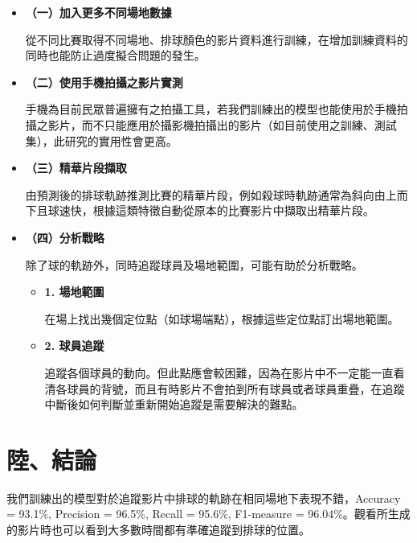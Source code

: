\begin{itemize}
    \setlength\parindent{2em}
    \item []
    \textbf{（一）加入更多不同場地數據}

    從不同比賽取得不同場地、排球顏色的影片資料進行訓練，在增加訓練資料的同時也能防止過度擬合問題的發生。

    \item []
    \textbf{（二）使用手機拍攝之影片實測}

    手機為目前民眾普遍擁有之拍攝工具，若我們訓練出的模型也能使用於手機拍攝之影片，而不只能應用於攝影機拍攝出的影片（如目前使用之訓練、測試集），此研究的實用性會更高。

    \item []
    \textbf{（三）精華片段擷取}

    由預測後的排球軌跡推測比賽的精華片段，例如殺球時軌跡通常為斜向由上而下且球速快，根據這類特徵自動從原本的比賽影片中擷取出精華片段。

    \item []
    \textbf{（四）分析戰略}
    
    除了球的軌跡外，同時追蹤球員及場地範圍，可能有助於分析戰略。

    \begin{itemize}
        \setlength\parindent{2em}
        \item []
        \textbf{1. 場地範圍}

        在場上找出幾個定位點（如球場端點），根據這些定位點訂出場地範圍。

        \item []
        \textbf{2. 球員追蹤}

        追蹤各個球員的動向。但此點應會較困難，因為在影片中不一定能一直看清各球員的背號，而且有時影片不會拍到所有球員或者球員重疊，在追蹤中斷後如何判斷並重新開始追蹤是需要解決的難點。
    \end{itemize}
\end{itemize}

\section{陸、結論}

我們訓練出的模型對於追蹤影片中排球的軌跡在相同場地下表現不錯，Accuracy = 93.1\%, Precision = 96.5\%, Recall = 95.6\%, F1-measure = 96.04\%。觀看所生成的影片時也可以看到大多數時間都有準確追蹤到排球的位置。

